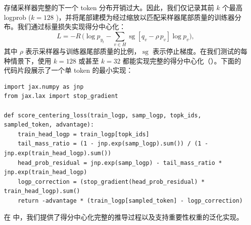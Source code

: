 存储采样器完整的下一个 token 分布开销过大。因此，我们仅记录其前 $k$ 个最高 logprob ($k=128$ )，并将尾部建模为经过缩放以匹配采样器尾部质量的训练器分布。我们通过标量损失实现得分中心化：
\begin{equation}
L = -R \, \Big( \log p_{y_t} - \sum_{v \in H} \operatorname{sg}\left[ q_v - \rho \, p_v \right] \log p_v \Big),
\label{eq:sc_loss_main}
\end{equation}
其中 $\rho$ 表示采样器与训练器尾部质量的比例，$\operatorname{sg}$ 表示停止梯度。在我们测试的每种情景下，使用 $k=128$ 或甚至 $k=32$ 都能实现完整的得分中心化（）。下面的代码片段展示了一个单 token 的最小实现：
\begin{lstlisting}[style=python]
import jax.numpy as jnp
from jax.lax import stop_gradient

def score_centering_loss(train_logp, samp_logp, topk_ids, sampled_token, advantage):
    train_head_logp = train_logp[topk_ids]
    tail_mass_ratio = (1 - jnp.exp(samp_logp).sum()) / (1 - jnp.exp(train_head_logp).sum())
    head_prob_residual = jnp.exp(samp_logp) - tail_mass_ratio * jnp.exp(train_head_logp)
    logp_correction = (stop_gradient(head_prob_residual) * train_head_logp).sum()
    return -advantage * (train_logp[sampled_token] - logp_correction)
\end{lstlisting}

在  中，我们提供了得分中心化完整的推导过程以及支持重要性权重的泛化实现。
